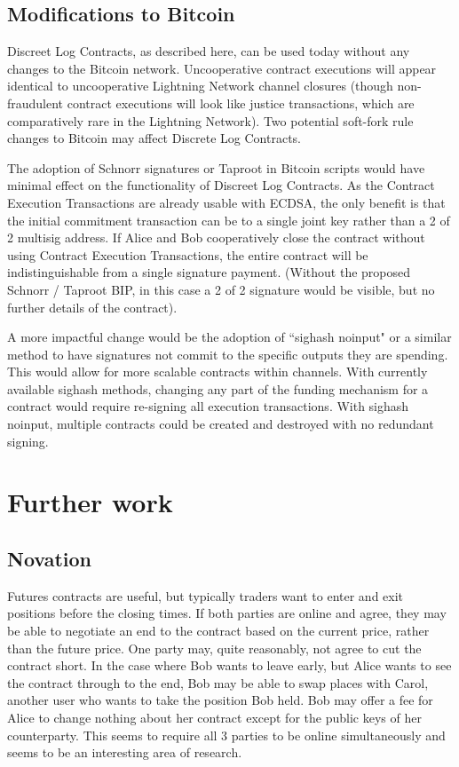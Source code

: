 \documentclass[10pt]{article}
\begin{document}
\subsection*{Modifications to Bitcoin}

Discreet Log Contracts, as described here, can be used today without any changes to the Bitcoin network.  Uncooperative contract executions will appear identical to uncooperative Lightning Network channel closures (though non-fraudulent contract executions will look like justice transactions, which are comparatively rare in the Lightning Network).  Two potential soft-fork rule changes to Bitcoin may affect Discrete Log Contracts.

The adoption of Schnorr signatures or Taproot \cite{tap} in Bitcoin scripts would have minimal effect on the functionality of Discreet Log Contracts.  As the Contract Execution Transactions are already usable with ECDSA, the only benefit is that the initial commitment transaction can be to a single joint key rather than a 2 of 2 multisig address.  If Alice and Bob cooperatively close the contract without using Contract Execution Transactions, the entire contract will be indistinguishable from a single signature payment.  (Without the proposed Schnorr / Taproot BIP, in this case a 2 of 2 signature would be visible, but no further details of the contract).

A more impactful change would be the adoption of ``sighash noinput" \cite{noin} or a similar method to have signatures not commit to the specific outputs they are spending.  This would allow for more scalable contracts within channels.  With currently available sighash methods, changing any part of the funding mechanism for a contract would require re-signing all execution transactions.  With sighash noinput, multiple contracts could be created and destroyed with no redundant signing.

\section*{Further work}

\subsection*{Novation}

Futures contracts are useful, but typically traders want to enter and exit positions before the closing times.   If both parties are online and agree, they may be able to negotiate an end to the contract based on the current price, rather than the future price.  One party may, quite reasonably, not agree to cut the contract short.  In the case where Bob wants to leave early, but Alice wants to see the contract through to the end, Bob may be able to swap places with Carol, another user who wants to take the position Bob held.  Bob may offer a fee for Alice to change nothing about her contract except for the public keys of her counterparty.  This seems to require all 3 parties to be online simultaneously and seems to be an interesting area of research.
\end{document}
